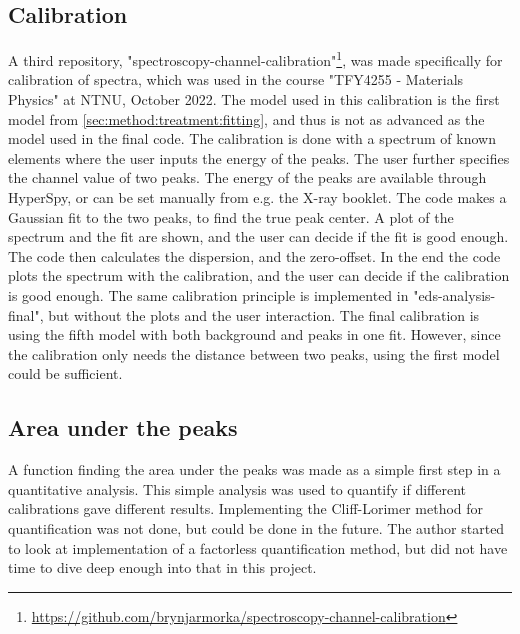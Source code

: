 \subsection{Calibration}
\label{sec:method:treatment:calibration}
A third repository, "spectroscopy-channel-calibration"\footnote{\url{https://github.com/brynjarmorka/spectroscopy-channel-calibration}}, was made specifically for calibration of spectra, which was used in the course "TFY4255 - Materials Physics" at NTNU, October 2022.
The model used in this calibration is the first model from \ref{sec:method:treatment:fitting}, and thus is not as advanced as the model used in the final code.
The calibration is done with a spectrum of known elements where the user inputs the energy of the peaks.
The user further specifies the channel value of two peaks.
The energy of the peaks are available through HyperSpy, or can be set manually from e.g. the X-ray booklet.
The code makes a Gaussian fit to the two peaks, to find the true peak center.
A plot of the spectrum and the fit are shown, and the user can decide if the fit is good enough.
The code then calculates the dispersion, and the zero-offset.
In the end the code plots the spectrum with the calibration, and the user can decide if the calibration is good enough.
The same calibration principle is implemented in "eds-analysis-final", but without the plots and the user interaction.
The final calibration is using the fifth model with both background and peaks in one fit.
However, since the calibration only needs the distance between two peaks, using the first model could be sufficient.




\subsection{Area under the peaks}
\label{sec:method:treatment:area}
A function finding the area under the peaks was made as a simple first step in a quantitative analysis.
This simple analysis was used to quantify if different calibrations gave different results.
Implementing the Cliff-Lorimer method for quantification was not done, but could be done in the future.
The author started to look at implementation of a factorless quantification method, but did not have time to dive deep enough into that in this project.


